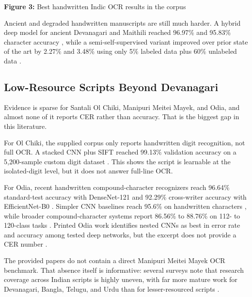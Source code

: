     
    \textbf{Figure 3:} Best handwritten Indic OCR results in the corpus
    
    
    Ancient and degraded handwritten manuscripts are still much harder. A hybrid deep model for ancient Devanagari and Maithili reached 96.97\% and 95.83\% character accuracy  \cite{Jindal2023A}, while a semi-self-supervised variant improved over prior state of the art by 2.27\% and 3.48\% using only 5\% labeled data plus 60\% unlabeled data  \cite{Jindal2024A}.
    
    
    \subsection*{Low-Resource Scripts Beyond Devanagari}
    
    
    Evidence is sparse for Santali Ol Chiki, Manipuri Meitei Mayek, and Odia, and almost none of it reports CER rather than accuracy. That is the biggest gap in this literature.
    
    
    For Ol Chiki, the supplied corpus only reports handwritten digit recognition, not full OCR. A stacked CNN plus SIFT reached 99.13\% validation accuracy on a 5,200-sample custom digit dataset  \cite{Mukherjee2025Deploying}. This shows the script is learnable at the isolated-digit level, but it does not answer full-line OCR.
    
    
    For Odia, recent handwritten compound-character recognizers reach 96.64\% standard-test accuracy with DenseNet-121 and 92.29\% cross-writer accuracy with EfficientNet-B0  \cite{Sahoo2026Handwritten}. Simpler CNN baselines reach 95.6\% on handwritten characters  \cite{Panda2022CNN}, while broader compound-character systems report 86.56\% to 88.76\% on 112- to 120-class tasks  \cite{Dey2022Offline} \cite{Panda2022Complex}. Printed Odia work identifies nested CNNs as best in error rate and accuracy among tested deep networks, but the excerpt does not provide a CER number  \cite{Pattanayak2020Performance}.
    
    
    The provided papers do not contain a direct Manipuri Meitei Mayek OCR benchmark. That absence itself is informative: several surveys note that research coverage across Indian scripts is highly uneven, with far more mature work for Devanagari, Bangla, Telugu, and Urdu than for lesser-resourced scripts  \cite{Kataria2018Review} \cite{Sharma2020Offline}.
    

